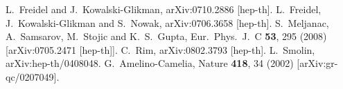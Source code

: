 \documentclass[prl,tightenlines]{revtex4}
\begin{document}
\begin{thebibliography}{99}
  L.~Freidel and J.~Kowalski-Glikman,
  arXiv:0710.2886 [hep-th].
  L.~Freidel, J.~Kowalski-Glikman and S.~Nowak,
  arXiv:0706.3658 [hep-th].
  S.~Meljanac, A.~Samsarov, M.~Stojic and K.~S.~Gupta,
  Eur.\ Phys.\ J.\  C {\bf 53}, 295 (2008)
  [arXiv:0705.2471 [hep-th]].
  C.~Rim,
  arXiv:0802.3793 [hep-th].
  L.~Smolin,
  arXiv:hep-th/0408048.
  G.~Amelino-Camelia,
  Nature {\bf 418}, 34 (2002)
  [arXiv:gr-qc/0207049].


\end{thebibliography}
\end{document}
